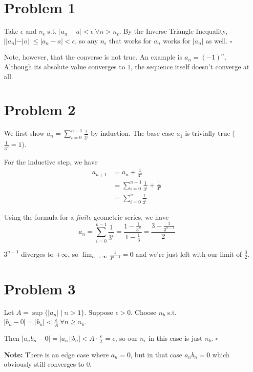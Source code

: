 \documentclass[12pt]{article}
\begin{document}
\section{Problem 1}

Take $\epsilon$ and $n_\epsilon$ s.t. $|a_n-a|<\epsilon\ \forall n > n_\epsilon$.
By the Inverse Triangle Inequality, $||a_n|-|a|| \le |a_n-a|<\epsilon$,
so any $n_\epsilon$ that works for $a_n$ works for $|a_n|$ as well. $\square$

Note, however, that the converse is not true.
An example is $a_n=(-1)^n$.
Although its absolute value converges to $1$, the sequence itself
doesn't converge at all.

\section{Problem 2}

We first show $a_n=\sum_{i=0}^{n-1} \frac{1}{3^i}$ by induction.
The base case $a_1$ is trivially true ($\frac{1}{3^0}=1$).

For the inductive step, we have
\begin{align*}
  a_{n+1}
   & = a_n + \frac{1}{3^n}                            \\
   & = \sum_{i=0}^{n-1} \frac{1}{3^i} + \frac{1}{3^n} \\
   & = \sum_{i=0}^{n} \frac{1}{3^i}
\end{align*}

Using the formula for a \textit{finite} geometric series, we have
\[a_n = \sum_{i=0}^{n-1} \frac{1}{3^i} = \frac{1-\frac{1}{3^n}}{1-\frac{1}{3}}=\frac{3-\frac{1}{3^{n-1}}}{2}\]

$3^{n-1}$ diverges to $+\infty$, so $\lim_{n \to \infty} \frac{1}{3^{n-1}}=0$
and we're just left with our limit of $\boxed{\frac{3}{2}}$.

\pagebreak

\section{Problem 3}

Let $A=\sup \{|a_n| \mid n > 1\}$.
Suppose $\epsilon > 0$.
Choose $n_b$ s.t. $|b_n-0|=|b_n| < \frac{\epsilon}{A}\ \forall n \ge n_b$.

Then $|a_nb_n-0|=|a_n||b_n| < A \cdot \frac{\epsilon}{A} = \epsilon$,
so our $n_\epsilon$ in this case is just $n_b$. $\square$

\textbf{Note:} There is an edge case where $a_n=0$, but in that case $a_nb_n=0$ which obviously still converges to $0$.
\end{document}
